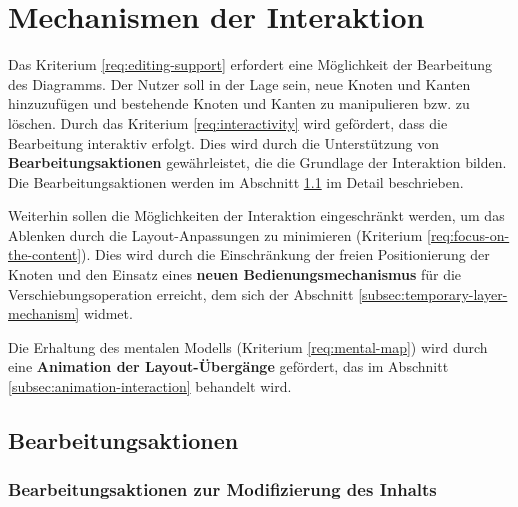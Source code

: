 \section{Mechanismen der Interaktion}
\label{sec:interaction-mechanisms}

Das Kriterium \ref{req:editing-support} erfordert eine Möglichkeit der Bearbeitung des Diagramms. Der Nutzer soll in der Lage sein, neue Knoten und Kanten hinzuzufügen und bestehende Knoten und Kanten zu manipulieren bzw. zu löschen. Durch das Kriterium \ref{req:interactivity} wird gefördert, dass die Bearbeitung interaktiv erfolgt. Dies wird durch die Unterstützung von \textbf{Bearbeitungsaktionen} gewährleistet, die die Grundlage der Interaktion bilden. Die Bearbeitungsaktionen werden im Abschnitt \ref{subsec:edit-actions} im Detail beschrieben.

Weiterhin sollen die Möglichkeiten der Interaktion eingeschränkt werden, um das Ablenken durch die Layout-Anpassungen zu minimieren (Kriterium \ref{req:focus-on-the-content}). Dies wird durch die Einschränkung der freien Positionierung der Knoten und den Einsatz eines \textbf{neuen Bedienungsmechanismus} für die Verschiebungsoperation erreicht, dem sich der Abschnitt \ref{subsec:temporary-layer-mechanism} widmet.

Die Erhaltung des mentalen Modells (Kriterium \ref{req:mental-map}) wird durch eine \textbf{Animation der Layout-Übergänge} gefördert, das im Abschnitt \ref{subsec:animation-interaction} behandelt wird.


\subsection{Bearbeitungsaktionen}
\label{subsec:edit-actions}



\subsubsection{Bearbeitungsaktionen zur Modifizierung des Inhalts}
